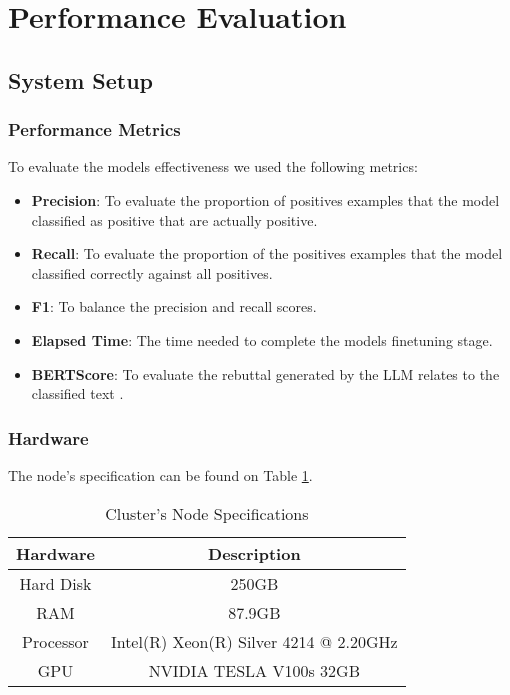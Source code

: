 \section{Performance Evaluation}
\subsection{System Setup}
\subsubsection{Performance Metrics}
To evaluate the models effectiveness we used the following metrics:

\begin{itemize}
	\item{\textbf{Precision}}: To evaluate the proportion of positives examples that the model classified as positive that are actually positive. 
	\item{\textbf{Recall}}: To evaluate the proportion of the positives examples that the model classified correctly against all positives.
	\item{\textbf{F1}}: To balance the precision and recall scores.
	\item{\textbf{Elapsed Time}}: The time needed to complete the models finetuning stage.
	\item{\textbf{BERTScore}}: To evaluate the rebuttal generated by the LLM relates to the classified text \cite{zhang2020bertscoreevaluatingtextgeneration}.
\end{itemize}

\subsubsection{Hardware}
The node's specification can be found on Table \ref{table:hardware}.
\begin{table}[ht!]
\centering
\caption{Cluster's Node Specifications}
{\footnotesize
\begin{tabular}{||c | c||} 
 \hline
\textbf{Hardware} & \textbf{Description} \\ 
 \hline
 Hard Disk & 250GB  \\ 
 \hline
 RAM & 87.9GB  \\ 
 \hline
 Processor & Intel(R) Xeon(R) Silver 4214 @ 2.20GHz \\ 
 \hline
 GPU & NVIDIA TESLA V100s 32GB \\
 \hline
\end{tabular}
}
\label{table:hardware}
\end{table}

